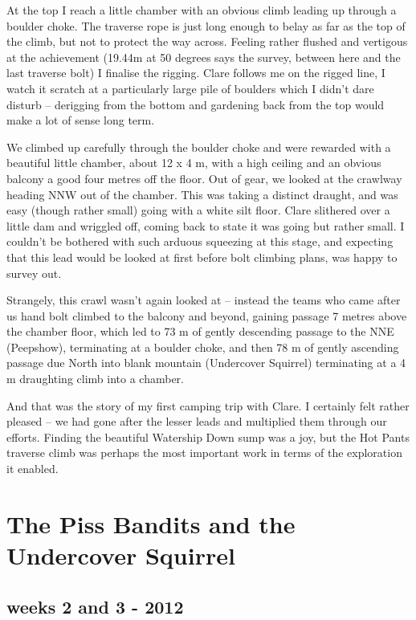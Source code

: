 At the top I reach a little chamber with an obvious climb leading up
through a boulder choke. The traverse rope is just long enough to belay
as far as the top of the climb, but not to protect the way across.
Feeling rather flushed and vertigous at the achievement (19.44m at 50
degrees says the survey, between here and the last traverse bolt) I
finalise the rigging. Clare follows me on the rigged line, I watch it
scratch at a particularly large pile of boulders which I didn't dare
disturb -- derigging from the bottom and gardening back from the top
would make a lot of sense long term.

We climbed up carefully through the boulder choke and were rewarded with
a beautiful little chamber, about 12 x 4 m, with a high ceiling and an
obvious balcony a good four metres off the floor. Out of gear, we looked
at the crawlway heading NNW out of the chamber. This was taking a
distinct draught, and was easy (though rather small) going with a white
silt floor. Clare slithered over a little dam and wriggled off, coming
back to state it was going but rather small. I couldn't be bothered with
such arduous squeezing at this stage, and expecting that this lead would
be looked at first before bolt climbing plans, was happy to survey out.

Strangely, this crawl wasn't again looked at -- instead the teams who
came after us hand bolt climbed to the balcony and beyond, gaining
passage 7 metres above the chamber floor, which led to 73 m of gently
descending passage to the NNE (Peepshow), terminating at a boulder
choke, and then 78 m of gently ascending passage due North into blank
mountain (Undercover Squirrel) terminating at a 4 m draughting climb
into a chamber.

And that was the story of my first camping trip with Clare. I certainly
felt rather pleased -- we had gone after the lesser leads and multiplied
them through our efforts. Finding the beautiful Watership Down sump was
a joy, but the Hot Pants traverse climb was perhaps the most important
work in terms of the exploration it enabled.


\section{The Piss Bandits and the Undercover
Squirrel}\label{the-piss-bandits-and-the-undercover-squirrel}

\subsection{weeks 2 and 3 - 2012}\label{weeks-2-and-3---2012}

